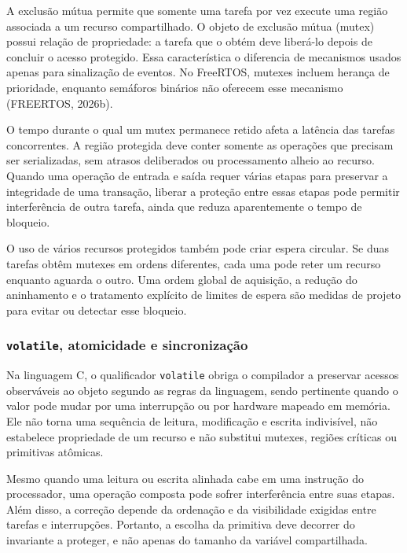 \documentclass{article}
\begin{document}
A exclus\~ao m\'utua permite que somente uma tarefa por vez execute uma regi\~ao associada a um recurso compartilhado. O objeto de exclus\~ao m\'utua (mutex) possui rela\c{c}\~ao de propriedade: a tarefa que o obt\'em deve liber\'a-lo depois de concluir o acesso protegido. Essa caracter\'istica o diferencia de mecanismos usados apenas para sinaliza\c{c}\~ao de eventos. No FreeRTOS, mutexes incluem heran\c{c}a de prioridade, enquanto sem\'aforos bin\'arios n\~ao oferecem esse mecanismo (FREERTOS, 2026b).


O tempo durante o qual um mutex permanece retido afeta a lat\^encia das tarefas concorrentes. A regi\~ao protegida deve conter somente as opera\c{c}\~oes que precisam ser serializadas, sem atrasos deliberados ou processamento alheio ao recurso. Quando uma opera\c{c}\~ao de entrada e sa\'ida requer v\'arias etapas para preservar a integridade de uma transa\c{c}\~ao, liberar a prote\c{c}\~ao entre essas etapas pode permitir interfer\^encia de outra tarefa, ainda que reduza aparentemente o tempo de bloqueio.


O uso de v\'arios recursos protegidos tamb\'em pode criar espera circular. Se duas tarefas obt\^em mutexes em ordens diferentes, cada uma pode reter um recurso enquanto aguarda o outro. Uma ordem global de aquisi\c{c}\~ao, a redu\c{c}\~ao do aninhamento e o tratamento expl\'icito de limites de espera s\~ao medidas de projeto para evitar ou detectar esse bloqueio.


\subsubsection{\texttt{volatile}, atomicidade e sincroniza\c{c}\~ao}


Na linguagem C, o qualificador \texttt{volatile} obriga o compilador a preservar acessos observ\'aveis ao objeto segundo as regras da linguagem, sendo pertinente quando o valor pode mudar por uma interrup\c{c}\~ao ou por hardware mapeado em mem\'oria. Ele n\~ao torna uma sequ\^encia de leitura, modifica\c{c}\~ao e escrita indivis\'ivel, n\~ao estabelece propriedade de um recurso e n\~ao substitui mutexes, regi\~oes cr\'iticas ou primitivas at\^omicas.


Mesmo quando uma leitura ou escrita alinhada cabe em uma instru\c{c}\~ao do processador, uma opera\c{c}\~ao composta pode sofrer interfer\^encia entre suas etapas. Al\'em disso, a corre\c{c}\~ao depende da ordena\c{c}\~ao e da visibilidade exigidas entre tarefas e interrup\c{c}\~oes. Portanto, a escolha da primitiva deve decorrer do invariante a proteger, e n\~ao apenas do tamanho da vari\'avel compartilhada.
\end{document}
